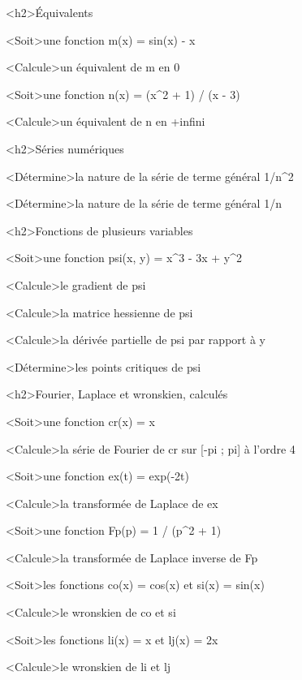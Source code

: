 \documentclass[marges=20, taille=11, precision=3]{texecole}
\begin{document}
<h2>Équivalents

<Soit>une fonction m(x) = sin(x) - x

<Calcule>un équivalent de m en 0

<Soit>une fonction n(x) = (x^2 + 1) / (x - 3)

<Calcule>un équivalent de n en +infini

<h2>Séries numériques

<Détermine>la nature de la série de terme général 1/n^2

<Détermine>la nature de la série de terme général 1/n

<h2>Fonctions de plusieurs variables

<Soit>une fonction psi(x, y) = x^3 - 3x + y^2

<Calcule>le gradient de psi

<Calcule>la matrice hessienne de psi

<Calcule>la dérivée partielle de psi par rapport à y

<Détermine>les points critiques de psi

<h2>Fourier, Laplace et wronskien, calculés

<Soit>une fonction cr(x) = x

<Calcule>la série de Fourier de cr sur [-pi ; pi] à l'ordre 4

<Soit>une fonction ex(t) = exp(-2t)

<Calcule>la transformée de Laplace de ex

<Soit>une fonction Fp(p) = 1 / (p^2 + 1)

<Calcule>la transformée de Laplace inverse de Fp

<Soit>les fonctions co(x) = cos(x) et si(x) = sin(x)

<Calcule>le wronskien de co et si

<Soit>les fonctions li(x) = x et lj(x) = 2x

<Calcule>le wronskien de li et lj
\end{document}
